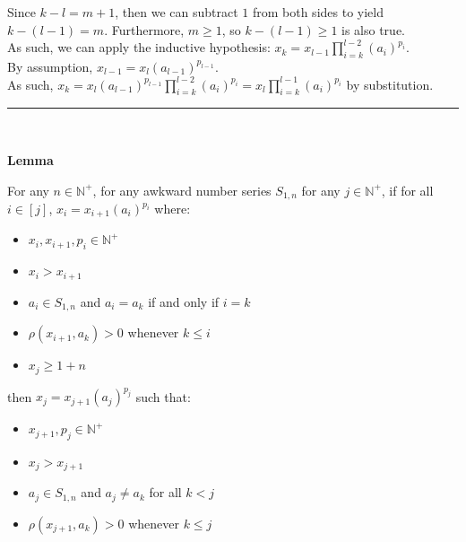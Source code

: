 \documentclass[a4paper,12pt]{article}
\begin{document}
\noindent Since $k - l = m + 1$, then we can subtract $1$ from both sides to yield $k - (l - 1) = m$. Furthermore, $m \geq 1$, so $k - (l - 1) \geq 1$ is also true.\\

\noindent As such, we can apply the inductive hypothesis: $\displaystyle x_k = x_{l - 1} \prod_{i = k}^{l - 2}(a_i)^{p_i}$.\\

\noindent By assumption, $x_{l - 1} = x_l(a_{l - 1})^{p_{l - 1}}$.\\

\noindent As such, $\displaystyle x_k = x_l(a_{l - 1})^{p_{l - 1}} \prod_{i = k}^{l - 2}(a_i)^{p_i} = x_l \prod_{i = k}^{l - 1}(a_i)^{p_i}$ by substitution.

\begin{center}
\noindent\rule{8cm}{0.4pt}
\end{center}
\noindent \\





\label{lemma:awkward_expansion}
\hypertarget{lemma:awkward_expansion}{}
\begin{tcolorbox}
\textbf{Lemma}

For any $n \in \mathbb{N}^+$, for any awkward number series $S_{1,n}$ for any $j \in \mathbb{N}^+$, if for all $i \in [j]$, $x_i = x_{i + 1}(a_i)^{p_i}$ where:

\begin{itemize}
\item $x_i, x_{i + 1}, p_i \in \mathbb{N}^+$

\item $x_i > x_{i + 1}$

\item $a_i \in S_{1, n}$ and $a_i = a_k$ if and only if $i = k$

\item $\rho(x_{i + 1}, a_k) > 0$ whenever $k \leq i$

\item $x_j \geq 1 + n$
\end{itemize}

then $x_j = x_{j + 1}(a_j)^{p_j}$ such that:

\begin{itemize}
\item $x_{j + 1}, p_j \in \mathbb{N}^+$

\item $x_j > x_{j + 1}$

\item $a_j \in S_{1, n}$ and $a_j \neq a_k$ for all $k < j$

\item $\rho(x_{j + 1}, a_k) > 0$ whenever $k \leq j$
\end{itemize}

\end{tcolorbox}
\end{document}
